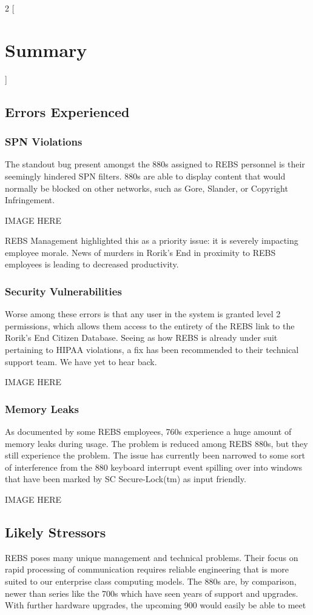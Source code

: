 \documentclass{article}
\begin{document}
\begin{multicols}{2}
[
\section{Summary}
]
\subsection{Errors Experienced}
\subsubsection{SPN Violations}
The standout bug present amongst the 880s assigned to REBS personnel is their seemingly hindered SPN filters. 880s are able to display content that would normally be blocked on other networks, such as Gore, Slander, or Copyright Infringement. 

IMAGE HERE

REBS Management highlighted this as a priority issue: it is severely impacting employee morale. News of murders in Rorik's End in proximity to REBS employees is leading to decreased productivity.

\subsubsection{Security Vulnerabilities}
Worse among these errors is that any user in the system is granted level 2 permissions, which allows them access to the entirety of the REBS link to the Rorik's End Citizen Database. Seeing as how REBS is already under suit pertaining to HIPAA violations, a fix has been recommended to their technical support team. We have yet to hear back. 

IMAGE HERE

\subsubsection{Memory Leaks}
As documented by some REBS employees, 760s experience a huge amount of memory leaks during usage. The problem is reduced among REBS 880s, but they still experience the problem. The issue has currently been narrowed to some sort of interference from the 880 keyboard interrupt event spilling over into windows that have been marked by SC Secure-Lock(tm) as input friendly.

IMAGE HERE

\subsection{Likely Stressors}
REBS poses many unique management and technical problems. Their focus on rapid processing of communication requires reliable engineering that is more suited to our enterprise class computing models. The 880s are, by comparison, newer than series like the 700s which have seen years of support and upgrades. With further hardware upgrades, the upcoming 900 would easily be able to meet 
\end{multicols}
\end{document}
